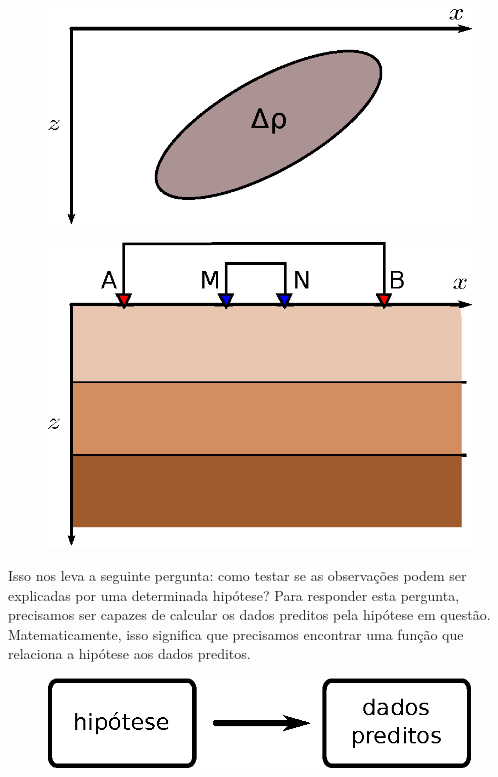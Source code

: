 \begin{figure}
    \centering
    \includegraphics[scale=1]{../figs/hipotese-grav.eps}
    \caption{}
    \label{hipotese-grav}
\end{figure}

\begin{figure}
    \centering
    \includegraphics[scale=1]{../figs/hipotese-sev.eps}
    \caption{}
    \label{hipotese-sev}
\end{figure}

\indent Isso nos leva a seguinte pergunta: como testar se as observações podem ser
explicadas por uma determinada hipótese? Para responder esta pergunta,
precisamos ser capazes de calcular os dados preditos pela hipótese em questão.
Matematicamente, isso significa que precisamos encontrar uma função que
relaciona a hipótese aos dados preditos.

\begin{figure}[!htb]
  \centering
    \includegraphics[scale=1]{../figs/hipotese-preditos.eps}
  \label{hipotese-preditos}
\end{figure}

